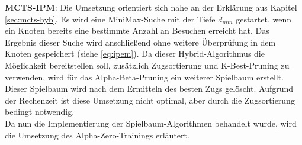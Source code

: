 \documentclass[12pt,a4paper,bibliography=totocnumbered,listof=totocnumbered]{article}
\begin{document}
\textbf{MCTS-IPM}: Die Umsetzung orientiert sich nahe an der Erklärung aus Kapitel \ref{sec:mcts-hyb}. Es wird eine MiniMax-Suche mit der Tiefe $d_{mm}$ gestartet, wenn ein Knoten bereits eine bestimmte Anzahl an Besuchen erreicht hat. Das Ergebnis dieser Suche wird anschließend ohne weitere Überprüfung in dem Knoten gespeichert (siehe \autoref{eq:ipem}). Da dieser Hybrid-Algorithmus die Möglichkeit bereitstellen soll, zusätzlich Zugsortierung und K-Best-Pruning zu verwenden, wird für das Alpha-Beta-Pruning ein weiterer Spielbaum erstellt. Dieser Spielbaum wird nach dem Ermitteln des besten Zugs gelöscht. Aufgrund der Rechenzeit ist diese Umsetzung nicht optimal, aber durch die Zugsortierung bedingt notwendig.\\
Da nun die Implementierung der Spielbaum-Algorithmen behandelt wurde, wird die Umsetzung des Alpha-Zero-Trainings erläutert.
\end{document}
